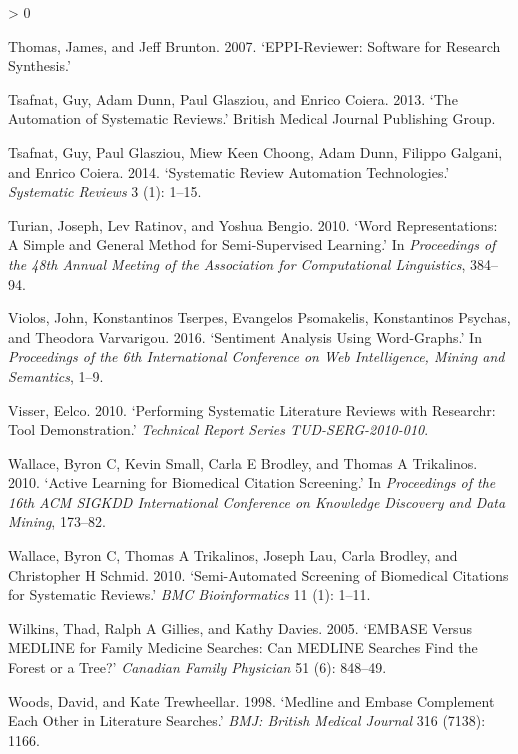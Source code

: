 \documentclass{article}
\newlength{\cslhangindent}
\newenvironment{CSLReferences}[2] %
 {%
  \setlength{\parindent}{0pt}
  \ifodd #1 \everypar{\setlength{\hangindent}{\cslhangindent}}\ignorespaces\fi
  \ifnum #2 > 0
  \setlength{\parskip}{#2\baselineskip}
  \fi
 }%
 {}
\begin{document}
\begin{CSLReferences}{1}{0}
\leavevmode\hypertarget{ref-thomas2007eppi}{}%
Thomas, James, and Jeff Brunton. 2007. {`EPPI-Reviewer: Software for
Research Synthesis.'}

\leavevmode\hypertarget{ref-tsafnat2013automation}{}%
Tsafnat, Guy, Adam Dunn, Paul Glasziou, and Enrico Coiera. 2013. {`The
Automation of Systematic Reviews.'} British Medical Journal Publishing
Group.

\leavevmode\hypertarget{ref-tsafnat2014systematic}{}%
Tsafnat, Guy, Paul Glasziou, Miew Keen Choong, Adam Dunn, Filippo
Galgani, and Enrico Coiera. 2014. {`Systematic Review Automation
Technologies.'} \emph{Systematic Reviews} 3 (1): 1--15.

\leavevmode\hypertarget{ref-turian2010word}{}%
Turian, Joseph, Lev Ratinov, and Yoshua Bengio. 2010. {`Word
Representations: A Simple and General Method for Semi-Supervised
Learning.'} In \emph{Proceedings of the 48th Annual Meeting of the
Association for Computational Linguistics}, 384--94.

\leavevmode\hypertarget{ref-violos2016sentiment}{}%
Violos, John, Konstantinos Tserpes, Evangelos Psomakelis, Konstantinos
Psychas, and Theodora Varvarigou. 2016. {`Sentiment Analysis Using
Word-Graphs.'} In \emph{Proceedings of the 6th International Conference
on Web Intelligence, Mining and Semantics}, 1--9.

\leavevmode\hypertarget{ref-visser2010performing}{}%
Visser, Eelco. 2010. {`Performing Systematic Literature Reviews with
Researchr: Tool Demonstration.'} \emph{Technical Report Series
TUD-SERG-2010-010}.

\leavevmode\hypertarget{ref-wallace2010active}{}%
Wallace, Byron C, Kevin Small, Carla E Brodley, and Thomas A Trikalinos.
2010. {`Active Learning for Biomedical Citation Screening.'} In
\emph{Proceedings of the 16th ACM SIGKDD International Conference on
Knowledge Discovery and Data Mining}, 173--82.

\leavevmode\hypertarget{ref-wallace2010semi}{}%
Wallace, Byron C, Thomas A Trikalinos, Joseph Lau, Carla Brodley, and
Christopher H Schmid. 2010. {`Semi-Automated Screening of Biomedical
Citations for Systematic Reviews.'} \emph{BMC Bioinformatics} 11 (1):
1--11.

\leavevmode\hypertarget{ref-wilkins2005embase}{}%
Wilkins, Thad, Ralph A Gillies, and Kathy Davies. 2005. {`EMBASE Versus
MEDLINE for Family Medicine Searches: Can MEDLINE Searches Find the
Forest or a Tree?'} \emph{Canadian Family Physician} 51 (6): 848--49.

\leavevmode\hypertarget{ref-woods1998medline}{}%
Woods, David, and Kate Trewheellar. 1998. {`Medline and Embase
Complement Each Other in Literature Searches.'} \emph{BMJ: British
Medical Journal} 316 (7138): 1166.


\end{CSLReferences}
\end{document}
